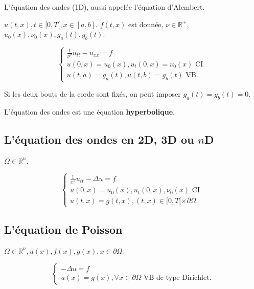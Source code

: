 \documentclass[french]{article}
\theoremstyle{definition}
\begin{document}
L'équation des ondes (1D), aussi appelée l'équation d'Alembert.

\(u(t,x), t \in [0,T[, x \in [a,b]\). \(f(t,x)\) est donnée, \(\nu \in \mathbb{R}^+\), \(u_0(x), \nu_0(x), g_a(t), g_b(t)\).

\begin{equation}
  \begin{cases}
    \frac{1}{\nu ^2}u _{tt} - u _{xx} = f \\
    u(0,x) = u_0(x), u_t(0,x) = \nu_0(x) \text{ CI } \\
    u(t,a) = g_a(t), u(t,b) = g_b(t) \text{ VB.}
  \end{cases}
\end{equation}


Si les deux bouts de la corde sont fixés, on peut imposer \(g_a(t) = g_b(t) = 0\).

L'équation des ondes est une équation \textbf{hyperbolique}.

\subsection{L'équation des ondes en 2D, 3D ou \(n\)D}

\(\Omega \in \mathbb{R}^n\).

\begin{equation}
  \begin{cases}
    \frac{1}{x ^2}u _{tt} - \Delta u = f \\
    u(0,x) = u_0(x), u_t(0,x), \nu_0(x) \text{ CI } \\
    u(t,x) = g(t,x), (t,x) \in [0,T[ \times \partial \Omega.
  \end{cases}
\end{equation}

\subsection{L'équation de Poisson}


\(\Omega \in \mathbb{R}^n, u(x), f(x), g(x), x \in \partial \Omega\).

\begin{equation}
  \begin{cases}
    - \Delta u = f \\
    u(x) = g(x), \forall x \in \partial \Omega \text{ VB de type Dirichlet.}
  \end{cases}
\end{equation}
\end{document}
